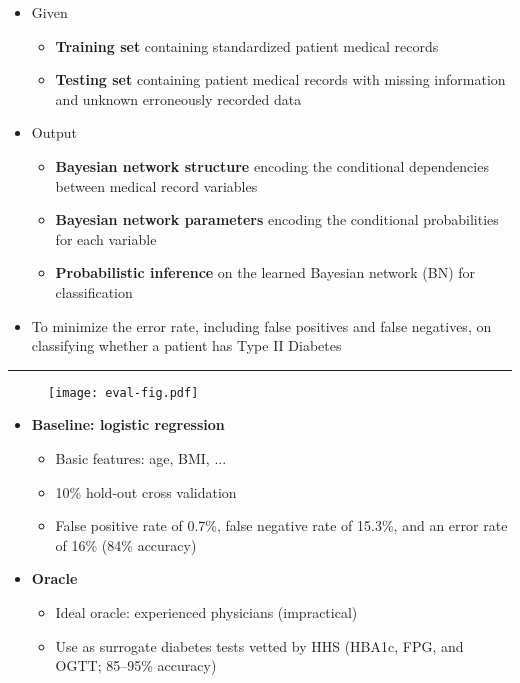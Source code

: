 \documentclass[a0]{a0poster}
\def\Head#1{\noindent{\LARGE\color{bluegray} #1}\bigskip}
\begin{document}
\begin{textblock}{7.0}
\begin{itemize}
  \item Given
  \begin{itemize}
    \item \textbf{Training set} containing standardized patient medical records
    \item \textbf{Testing set} containing patient medical records with missing information and unknown erroneously recorded data
  \end{itemize}

  \item Output
  \begin{itemize}
    \item \textbf{Bayesian network structure} encoding the conditional dependencies between medical record variables
    \item \textbf{Bayesian network parameters} encoding the conditional probabilities for each variable
    \item \textbf{Probabilistic inference} on the learned Bayesian network (BN) for classification
  \end{itemize}

  \item To minimize the error rate, including false positives and false negatives, on classifying whether a patient has Type II Diabetes

\end{itemize}

\medskip
\hrule\medskip
\Head{Evaluation Criteria}

\begin{figure}[!h]
  \centering
  \texttt{[image: eval-fig.pdf]}
  \label{fig2}
\end{figure}

\begin{multicols}{2}
  \begin{itemize}
    
    \item \textbf{Baseline: logistic regression}
    \begin{itemize}
      \item Basic features: age, BMI, ...
      \item 10\% hold-out cross validation
      \item False positive rate of 0.7\%, false negative rate of 15.3\%, and an error rate of 16\% (84\% accuracy)
    \end{itemize}

    \item \textbf{Oracle}
    \begin{itemize}
      \item Ideal oracle: experienced physicians (impractical)
      \item Use as surrogate diabetes tests vetted by HHS (HBA1c, FPG, and OGTT; 85--95\% accuracy)
    \end{itemize}

  \end{itemize}
\end{multicols}

\end{textblock}
\end{document}
